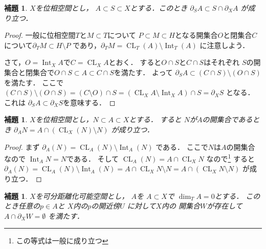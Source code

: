 \documentclass[leqno, a4paper, 12pt]{jsarticle}
\newtheorem{lem}[thm]{補題}
\DeclareMathOperator{\cl}{CL}
\DeclareMathOperator{\nai}{Int}
\begin{document}
\begin{lem}\label{lem:par}
$X$を位相空間とし，
$A\subset S\subset X$とする．このとき
$\partial_{S} A\subset S\cap \partial_{X}A$
が成り立つ．
\end{lem}
\begin{proof}
一般に位相空間$T$と$M\subset T$について
$P\subset M\subset H$となる開集合$O$と閉集合$C$
について$\partial_{T}M\subset H\setminus P$
であり，$\partial_{T}M=\cl_{T}(A)\setminus \nai_{T}(A)$
に注意しよう．

さて，$O=\nai_{X}A$で$C=\cl_{X}A$とおく．
すると$O\cap S$と$C\cap S$はそれぞれ
$S$の開集合と閉集合で$O\cap S\subset A\subset C\cap S$を満たす．
よって
$\partial_{S}A\subset (C\cap S)\setminus (O\cap S)$
を満たす．
ここで
$(C\cap S)\setminus (O\cap S)=
(C\setminus O)\cap S=(\cl_{X}A\setminus \nai_{X}A)\cap S=\partial_{X}S$
となる．
これは
$\partial_{S}A\subset \partial_{X}S$を意味する．
\end{proof}



\begin{lem}\label{lem:partial}
$X$を位相空間とし，$N\subset A\subset X$とする．
すると
$N$が$A$の開集合であるとき
$\partial_{A} N=A\cap (\cl_{X}(N)\setminus N)$
が成り立つ．
\end{lem}
\begin{proof}
まず
$\partial_{A}(N)=\cl_{A}(N)\setminus \nai_{A}(N)$
である．
ここで$N$は$A$の開集合なので
$\nai_{A}N=N$である．
そして
$\cl_{A}(N)=A\cap \cl_{X}N$
なので\footnote{この等式は一般に成り立つ}
すると
$\partial_{A}(N)=\cl_{A}(N)\setminus \nai_{A}(N)
=A\cap \cl_{X}N\setminus N=A\cap (\cl_{X}N\setminus N)$
が成り立つ．
\end{proof}


\begin{lem}\label{lem:jojo}
$X$を可分距離化可能空間とし，
$A$を
$A\subset X$で
$\dim_{T}A=0$とする．
このとき任意の$p\in A$と
$X$内の$p$の開近傍$U$
に対して$X$内の
開集合$W$が存在して
$A\cap \partial_{X} W=\emptyset$
を満たす．
\end{lem}
\end{document}
